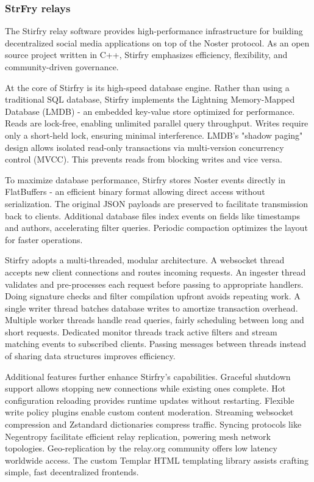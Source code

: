 \subsubsection{StrFry relays}
The Stirfry relay software provides high-performance infrastructure for building decentralized social media applications on top of the Noster protocol. As an open source project written in C++, Stirfry emphasizes efficiency, flexibility, and community-driven governance.

At the core of Stirfry is its high-speed database engine. Rather than using a traditional SQL database, Stirfry implements the Lightning Memory-Mapped Database (LMDB) - an embedded key-value store optimized for performance. Reads are lock-free, enabling unlimited parallel query throughput. Writes require only a short-held lock, ensuring minimal interference. LMDB's "shadow paging" design allows isolated read-only transactions via multi-version concurrency control (MVCC). This prevents reads from blocking writes and vice versa.

To maximize database performance, Stirfry stores Noster events directly in FlatBuffers - an efficient binary format allowing direct access without serialization. The original JSON payloads are preserved to facilitate transmission back to clients. Additional database files index events on fields like timestamps and authors, accelerating filter queries. Periodic compaction optimizes the layout for faster operations.

Stirfry adopts a multi-threaded, modular architecture. A websocket thread accepts new client connections and routes incoming requests. An ingester thread validates and pre-processes each request before passing to appropriate handlers. Doing signature checks and filter compilation upfront avoids repeating work. A single writer thread batches database writes to amortize transaction overhead. Multiple worker threads handle read queries, fairly scheduling between long and short requests. Dedicated monitor threads track active filters and stream matching events to subscribed clients. Passing messages between threads instead of sharing data structures improves efficiency.

Additional features further enhance Stirfry's capabilities. Graceful shutdown support allows stopping new connections while existing ones complete. Hot configuration reloading provides runtime updates without restarting. Flexible write policy plugins enable custom content moderation. Streaming websocket compression and Zstandard dictionaries compress traffic. Syncing protocols like Negentropy facilitate efficient relay replication, powering mesh network topologies. Geo-replication by the relay.org community offers low latency worldwide access. The custom Templar HTML templating library assists crafting simple, fast decentralized frontends.

